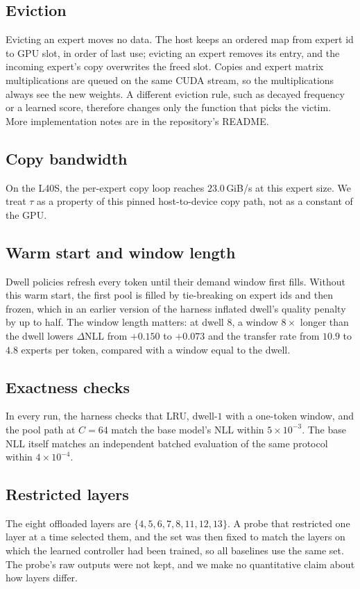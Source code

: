 \documentclass{article}
\begin{document}
\subsection{Eviction}
Evicting an expert moves no data. The host keeps an
ordered map from expert id to GPU slot, in order of last use; evicting an
expert removes its entry, and the incoming expert's copy overwrites the freed
slot. Copies and expert matrix multiplications are queued on the same CUDA
stream, so the multiplications always see the new weights. A different
eviction rule, such as decayed frequency or a learned score, therefore
changes only the function that picks the victim. More implementation notes
are in the repository's README.

\subsection{Copy bandwidth}
On the L40S, the per-expert copy loop reaches
$23.0$\,GiB/s at this expert size. We treat $\tau$ as a property of this
pinned host-to-device copy path, not as a constant of the GPU.

\subsection{Warm start and window length}
Dwell policies refresh every token
until their demand window first fills. Without this warm start, the first
pool is filled by tie-breaking on expert ids and then frozen, which in an
earlier version of the harness inflated dwell's quality penalty by up to
half. The window length matters: at dwell $8$, a window $8\times$ longer than
the dwell lowers $\Delta$NLL from $+0.150$ to $+0.073$ and the transfer rate
from $10.9$ to $4.8$ experts per token, compared with a window equal to the
dwell.

\subsection{Exactness checks}
In every run, the harness checks that LRU,
dwell-$1$ with a one-token window, and the pool path at $C{=}64$ match the
base model's NLL within $5\times10^{-3}$. The base NLL itself matches an
independent batched evaluation of the same protocol within $4\times10^{-4}$.

\subsection{Restricted layers}
The eight offloaded layers are
$\{4,5,6,7,8,11,12,13\}$. A probe that restricted one layer at a time
selected them, and the set was then fixed to match the layers on which the
learned controller had been trained, so all baselines use the same set. The
probe's raw outputs were not kept, and we make no quantitative claim about
how layers differ.
\end{document}

